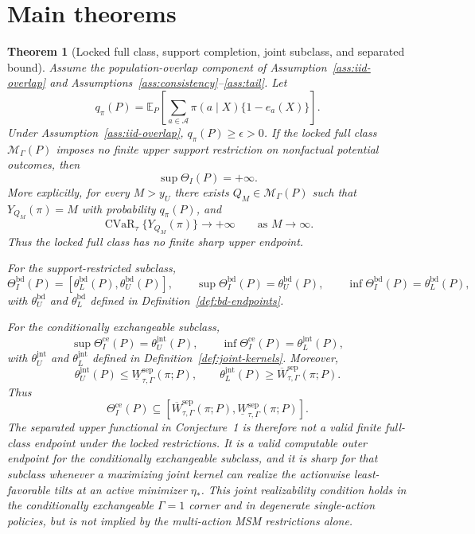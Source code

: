 \documentclass[11pt]{article}
\newcommand{\E}{\mathbb{E}}
\theoremstyle{definition}
\theoremstyle{plain}
\newtheorem{theorem}{Theorem}
\theoremstyle{remark}
\begin{document}
\section{Main theorems}
\begin{theorem}[Locked full class, support completion, joint subclass, and separated bound]\label{thm:joint-sharp-and-sep-bound}
Assume the population-overlap component of Assumption~\ref{ass:iid-overlap} and
Assumptions~\ref{ass:consistency}--\ref{ass:tail}.  Let
\[
q_\pi(P)
=
\E_P\left[
\sum_{a\in\mathcal A}\pi(a\mid X)\{1-e_a(X)\}
\right].
\]
Under Assumption~\ref{ass:iid-overlap}, \(q_\pi(P)\ge\epsilon>0\).  If the
locked full class \(\mathcal M_\Gamma(P)\) imposes no finite upper support
restriction on nonfactual potential outcomes, then
\[
\sup\Theta_I(P)=+\infty.
\]
More explicitly, for every \(M>y_U\) there exists
\(Q_M\in\mathcal M_\Gamma(P)\) such that \(Y_{Q_M}(\pi)=M\) with probability
\(q_\pi(P)\), and
\[
\operatorname{CVaR}_{\tau}\{Y_{Q_M}(\pi)\}\to+\infty
\qquad\text{as }M\to\infty.
\]
Thus the locked full class has no finite sharp upper endpoint.

For the support-restricted subclass,
\[
\Theta_I^{\mathrm{bd}}(P)
=
\left[\theta_L^{\mathrm{bd}}(P),\theta_U^{\mathrm{bd}}(P)\right],
\qquad
\sup\Theta_I^{\mathrm{bd}}(P)=\theta_U^{\mathrm{bd}}(P),
\qquad
\inf\Theta_I^{\mathrm{bd}}(P)=\theta_L^{\mathrm{bd}}(P),
\]
with \(\theta_U^{\mathrm{bd}}\) and \(\theta_L^{\mathrm{bd}}\) defined in
Definition~\ref{def:bd-endpoints}.

For the conditionally exchangeable subclass,
\[
\sup\Theta_I^{\mathrm{ce}}(P)=\theta_U^{\mathrm{jnt}}(P),
\qquad
\inf\Theta_I^{\mathrm{ce}}(P)=\theta_L^{\mathrm{jnt}}(P),
\]
with \(\theta_U^{\mathrm{jnt}}\) and \(\theta_L^{\mathrm{jnt}}\) defined in
Definition~\ref{def:joint-kernels}.  Moreover,
\[
\theta_U^{\mathrm{jnt}}(P)
\le
\underline W_{\tau,\Gamma}^{\mathrm{sep}}(\pi;P),
\qquad
\theta_L^{\mathrm{jnt}}(P)
\ge
\overline W_{\tau,\Gamma}^{\mathrm{sep}}(\pi;P).
\]
Thus
\[
\Theta_I^{\mathrm{ce}}(P)\subseteq
\left[
\overline W_{\tau,\Gamma}^{\mathrm{sep}}(\pi;P),
\underline W_{\tau,\Gamma}^{\mathrm{sep}}(\pi;P)
\right].
\]
The separated upper functional in Conjecture~1 is therefore not a valid finite
full-class endpoint under the locked restrictions.  It is a valid computable
outer endpoint for the conditionally exchangeable subclass, and it is sharp for
that subclass whenever a maximizing joint kernel can realize the actionwise
least-favorable tilts at an active minimizer \(\eta_*\).  This joint
realizability condition holds in the conditionally exchangeable
\(\Gamma=1\) corner and in degenerate single-action policies, but is not implied
by the multi-action MSM restrictions alone.
\end{theorem}
\end{document}
